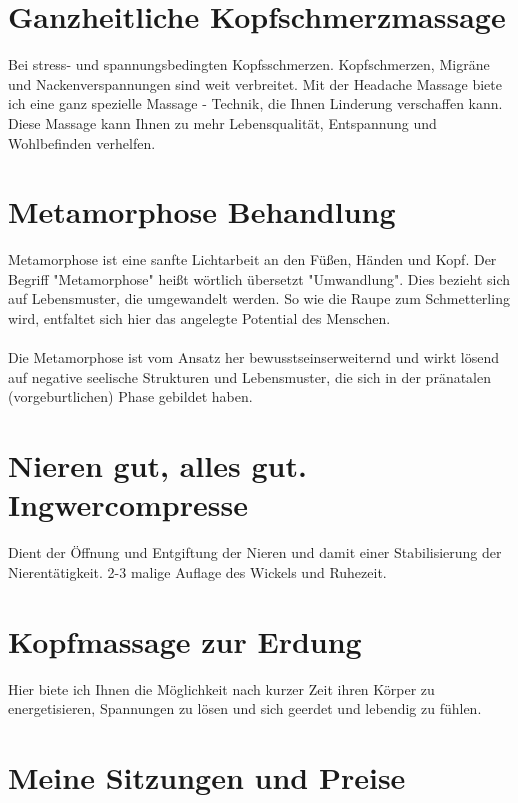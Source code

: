 \documentclass[foldmark,10pt,a4paper,notumble]{leaflet}
\begin{document}
\section{Ganzheitliche Kopfschmerzmassage}

Bei stress- und spannungsbedingten Kopfsschmerzen. 
Kopfschmerzen, Migräne und Nackenverspannungen sind weit verbreitet. Mit der Headache Massage biete ich eine ganz spezielle Massage - Technik, die Ihnen Linderung verschaffen kann. Diese Massage kann Ihnen zu mehr Lebensqualität, Entspannung und Wohlbefinden verhelfen. 

\section{Metamorphose Behandlung}

Metamorphose ist eine sanfte Lichtarbeit an den Füßen, Händen und Kopf. Der Begriff "Metamorphose" heißt wörtlich übersetzt "Umwandlung". Dies bezieht sich auf Lebensmuster, die umgewandelt werden. So wie die Raupe zum Schmetterling wird, entfaltet sich hier das angelegte Potential des Menschen.\\
\\
Die Metamorphose ist vom Ansatz her bewusstseins\-erweiternd und wirkt lösend auf negative seelische Strukturen und Lebensmuster, die sich in der pränatalen (vorgeburtlichen) Phase gebildet haben.



\section{Nieren gut, alles gut. \\Ingwercompresse}
Dient der Öffnung und Entgiftung der Nieren und damit einer Stabilisierung der Nierentätigkeit. 2-3 malige Auflage des Wickels und Ruhezeit. 

\section{Kopfmassage zur Erdung}
Hier biete ich Ihnen die Möglichkeit nach kurzer Zeit ihren Körper zu energetisieren, Spannungen zu lösen und sich geerdet und lebendig zu fühlen. 

\newpage
\section{Meine Sitzungen und Preise}
\end{document}
